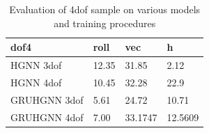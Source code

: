 \begin{table}[h!]
	\centering
	\caption{Evaluation of 4dof sample on various models and training procedures} %
	\label{tab:my_label}               %
	\begin{tabular}{|l|l|l|l|}
		\hline
		dof4 & roll & vec & h\\ 
		\hline
		HGNN 3dof & 12.35 & 31.85 & 2.12 \\  
		\hline
		HGNN 4dof & 10.45 & 32.28 & 22.9 \\  
		\hline
		GRUHGNN 3dof & 5.61 & 24.72 & 10.71 \\  
		\hline
		GRUHGNN 4dof & 7.00 & 33.1747 & 12.5609 \\  
		\hline
	\end{tabular}
\end{table}






